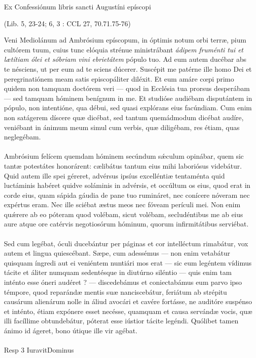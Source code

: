 \documentclass[options]{article}
\begin{document}
	Ex Confessiónum libris sancti Augustíni epíscopi
	\begin{flushright}
		(Lib. 5, 23-24; 6, 3 : CCL 27, 70.71.75-76)	
	\end{flushright}
	Veni Mediolánum ad Ambrósium epíscopum, in óptimis notum orbi terræ, pium cultórem tuum, cuius tunc elóquia strénue ministrábant \emph{ádipem fruménti tui et lætítiam ólei et sóbriam vini ebrietátem} pópulo tuo. Ad eum autem ducébar abs te nésciens, ut per eum ad te sciens dúcerer. Suscépit me patérne ille homo Dei et peregrinatiónem meam satis episcopáliter diléxit. Et eum amáre cœpi primo quidem non tamquam doctórem veri — quod in Ecclésia tua prorsus desperábam — sed tamquam hóminem benígnum in me. Et studióse audiébam disputántem in pópulo, non intentióne, qua débui, sed quasi explórans eius facúndiam. Cum enim non satágerem díscere quæ dicébat, sed tantum quemádmodum dicébat audíre, veniébant in ánimum meum simul cum verbis, quæ diligébam, res étiam, quas neglegébam.\\
	\\
	Ambrósium felícem quemdam hóminem secúndum s\'{æ}culum opinábar, quem sic tantæ potestátes honorárent: cælibátus tantum eius mihi laboriósus videbátur. Quid autem ille spei géreret, advérsus ipsíus excelléntiæ tentaménta quid luctáminis habéret quidve soláminis in advérsis, et occúltum os eius, quod erat in corde eius, quam sápida gáudia de pane tuo rumináret, nec conícere nóveram nec expértus eram. Nec ille sciébat æstus meos nec fóveam perículi mei. Non enim qu\'{æ}rere ab eo póteram quod volébam, sicut volébam, secludéntibus me ab eius aure atque ore catérvis negotiosórum hóminum, quorum infirmitátibus serviébat.\\
	\\
	Sed cum legébat, óculi ducebántur per páginas et cor intelléctum rimabátur, vox autem et lingua quiescébant. Sæpe, cum adessémus — non enim vetabátur quisquam íngredi aut ei veniéntem nuntiári mos erat — sic eum legéntem vídimus tácite et áliter numquam sedentésque in diutúrno siléntio — quis enim tam inténto esse óneri audéret ? — discedebámus et coniectabámus eum parvo ipso témpore, quod reparándæ mentis suæ nanciscebátur, feriátum ab strépitu causárum alienárum nolle in áliud avocári et cavére fortásse, ne auditóre suspénso et inténto, étiam expónere esset necésse, quamquam et causa servándæ vocis, quæ illi facíllime obtundebátur, póterat esse iústior tácite legéndi. Quólibet tamen ánimo id ágeret, bono útique ille vir agébat.\\
	\\
	Resp 3 IuravitDominus
\end{document}
